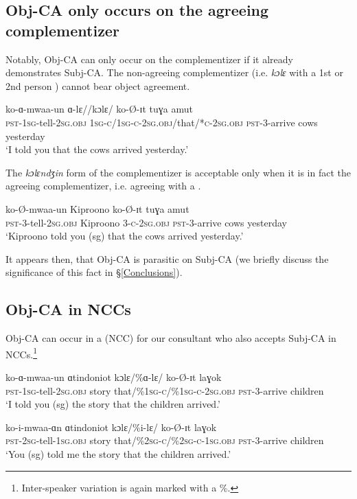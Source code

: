 \documentclass[output=paper
,newtxmath
,modfonts
,nonflat]{langsci/langscibook}
\begin{document}
\subsection{Obj-CA only occurs on the agreeing complementizer} \label{Obj-CA Parasitic}

\noindent Notably,  Obj-CA can only occur on the complementizer if it already demonstrates Subj-CA. The non-agreeing complementizer (i.e. \textit{kɔlɛ} with a 1st or 2nd person ) cannot bear object agreement. 

\ea
\gll ko-ɑ-mwaa-un ɑ-lɛ//kɔlɛ/ ko-\O-ɪt tuɣa amut \\
\textsc{pst}-1\textsc{sg}-tell-2\textsc{sg}.\textsc{obj} 1\textsc{sg-c/}1\textsc{sg-c-}2\textsc{sg}.\textsc{obj}/that/*\textsc{c}-2\textsc{sg}.\textsc{obj} \textsc{pst}-3-arrive cows yesterday \\
\glt `I told you that the cows arrived yesterday.'
\z

\noindent The \textit{kɔlɛndʒin} form of the complementizer is acceptable only when it is in fact the agreeing complementizer, i.e. agreeing with a  .

\ea
\gll ko-\O-mwaa-un Kiproono  ko-\O-ɪt tuɣa amut \\
\textsc{pst}-3-tell-2\textsc{sg}.\textsc{obj} Kiproono 3-\textsc{c}-2\textsc{sg}.\textsc{obj} \textsc{pst}-3-arrive cows yesterday \\
\glt `Kiproono told you (sg) that the cows arrived yesterday.'
\z

\noindent It appears then, that Obj-CA is parasitic on Subj-CA (we briefly discuss the significance of this fact in \S \ref{Conclusions}). 

\subsection{Obj-CA in NCCs}

Obj-CA can occur in a  (NCC) for our consultant who also accepts Subj-CA in NCCs.\footnote{Inter-speaker variation is again marked with a \%.}

\ea
\begin{xlist}

\ex
\gll ko-ɑ-mwaa-un ɑtindoniot kɔlɛ/\%ɑ-lɛ/ ko-\O-ɪt laɣok \\
\textsc{pst}-1\textsc{sg}-tell-2\textsc{sg}.\textsc{obj} story that/\%1\textsc{sg-c/\%}1\textsc{sg-c-}2\textsc{sg}.\textsc{obj} \textsc{pst}-3-arrive children \\
\glt `I told you (sg) the story that the children arrived.'

\ex
\gll ko-i-mwaa-ɑn ɑtindoniot kɔlɛ/\%i-lɛ/ ko-\O-ɪt laɣok \\
\textsc{pst}-2\textsc{sg}-tell-1\textsc{sg}.\textsc{obj} story that/\%2\textsc{sg-c/\%}2\textsc{sg-c-}1\textsc{sg}.\textsc{obj} \textsc{pst}-3-arrive children \\
\glt `You (sg) told me the story that the children arrived.'

\end{xlist}
\z
\end{document}
